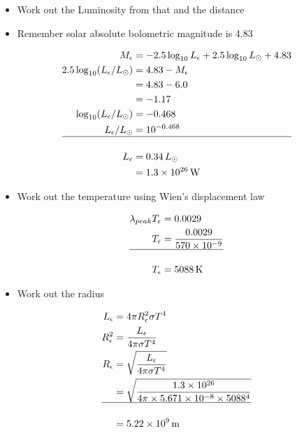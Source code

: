 \documentclass[
  letterpaper,
  DIV=11,
  numbers=noendperiod]{scrreprt}
\providecommand{\tightlist}{%
  \setlength{\itemsep}{0pt}\setlength{\parskip}{0pt}}\usepackage{longtable,booktabs,array}
\begin{document}
\begin{itemize}
\tightlist
\item
  Work out the Luminosity from that and the distance
\item
  Remember solar absolute bolometric magnitude is 4.83
\end{itemize}

\begin{align}
M_{\epsilon} &= -2.5\log_{10}L_\epsilon+2.5\log_{10}L_\odot + 4.83 \\
2.5\log_{10}(L_\epsilon / L_\odot) &= 4.83 - M_\epsilon \\
&= 4.83 - 6.0  \\
&= -1.17 \\
\log_{10}(L_\epsilon / L_\odot) & = -0.468 \\
L_\epsilon / L_\odot &= 10^{-0.468} \\
\hline \\
L_\epsilon &= 0.34\,L_\odot \\
&= 1.3\times 10^{26}\,\mathrm{W}
\end{align}

\begin{itemize}
\tightlist
\item
  Work out the temperature using Wien's displacement law
\end{itemize}

\begin{align}
\lambda_{peak} T_\epsilon &= 0.0029 \\
T_\epsilon &= \frac{0.0029}{ 570\times 10^{-9}} \\
\hline \\
T_\epsilon &= 5088\,\mathrm{K}
\end{align}

\begin{itemize}
\tightlist
\item
  Work out the radius
\end{itemize}

\begin{align}
L_\epsilon &= 4\pi R_\epsilon^2 \sigma T^4 \\
R_\epsilon^2 &= \frac{L_\epsilon}{4\pi \sigma T^4} \\
R_\epsilon &= \sqrt{\frac{L_\epsilon}{4\pi \sigma T^4}} \\
&= \sqrt{\frac{1.3\times 10^{26}}{4\pi \times 5.671\times10^{-8}\times 5088^4}}  \\
\hline \\
&= 5.22\times 10^{9}\,\mathrm{m}
\end{align}
\end{document}
